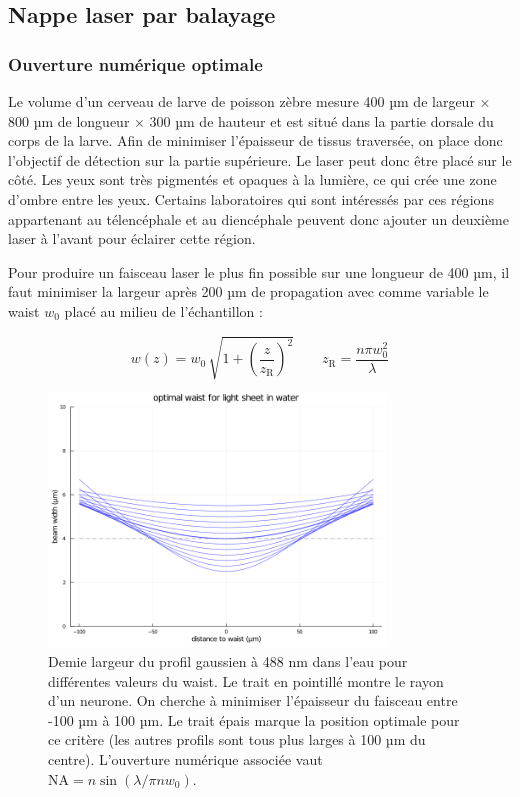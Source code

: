 \subsection{Nappe laser par balayage}

\subsubsection{Ouverture numérique optimale}

Le volume d'un cerveau de larve de poisson zèbre mesure 400 µm de largeur × 800 µm de longueur × 300 µm de hauteur et est situé dans la partie dorsale du corps de la larve. Afin de minimiser l'épaisseur de tissus traversée, on place donc l'objectif de détection sur la partie supérieure. Le laser peut donc être placé sur le côté. Les yeux sont très pigmentés et opaques à la lumière, ce qui crée une zone d'ombre entre les yeux. Certains laboratoires qui sont intéressés par ces régions appartenant au télencéphale et au diencéphale peuvent donc ajouter un deuxième laser à l'avant pour éclairer cette région.

Pour produire un faisceau laser le plus fin possible sur une longueur de 400 µm, il faut minimiser la largeur après 200 µm de propagation avec comme variable le waist $w_0$ placé au milieu de l'échantillon :

$$
w(z) = w_0 \, \sqrt{ 1+ {\left( \frac{z}{z_\mathrm{R}} \right)}^2 } \qquad z_\mathrm{R} = \frac{n \pi w_0^2 }{\lambda}
$$

\begin{figure}
\centering
\includegraphics[width=0.8\textwidth]{./files/possible-waist_1P.png}
\caption{Demie largeur du profil gaussien à 488 nm dans l'eau pour différentes valeurs du waist. Le trait en pointillé montre le rayon d'un neurone. On cherche à minimiser l'épaisseur du faisceau entre -100 µm à 100 µm. Le trait épais marque la position optimale pour ce critère (les autres profils sont tous plus larges à 100 µm du centre). L'ouverture numérique associée vaut $ \mathrm{NA} = n\sin(\lambda/\pi n w_0) $.}
\end{figure}


